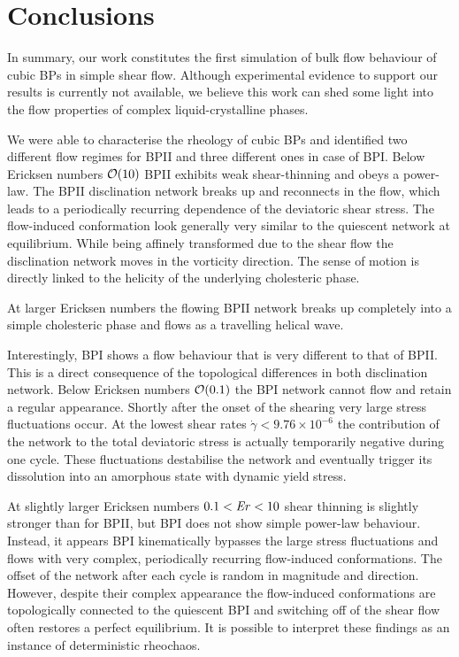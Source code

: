 \documentclass[aps,pre,reprint,superscriptaddress, twocolumn]{revtex4}
\newcommand{\e}[1]{\times10^{#1}}
\newcommand{\gd}{\dot{\gamma}}
\begin{document}
\clearpage

\section{Conclusions}

In summary, our work constitutes the first simulation of bulk flow behaviour 
of cubic BPs in simple shear flow. Although experimental evidence to support
our results is currently not available, we believe this work can shed some light into the 
flow properties of complex liquid-crystalline phases.
  
We were able to characterise the rheology of cubic BPs and identified 
two different flow regimes for BPII and three different ones in case of BPI. 
Below Ericksen numbers ${\cal O}(10)$ BPII exhibits weak shear-thinning and 
obeys a power-law.  The BPII disclination network breaks up and reconnects 
in the flow, which leads to a periodically recurring dependence 
of the deviatoric shear stress. The flow-induced conformation look generally
very similar to the quiescent network at equilibrium. 
While being affinely transformed due to the shear flow
the disclination network moves in the vorticity direction. The sense of
motion is directly linked to the helicity of the underlying cholesteric phase.

At larger Ericksen numbers the flowing BPII network breaks up completely into 
a simple cholesteric phase and flows as a travelling helical wave. 

Interestingly, BPI shows a flow behaviour that is very different to that of BPII.
This is a direct consequence of the topological differences in both disclination 
network. Below Ericksen numbers ${\cal O}(0.1)$ the BPI network cannot flow and 
retain a regular appearance. Shortly after the onset of the shearing 
very large stress fluctuations occur. At the lowest shear rates $\gd<9.76\e{-6}$
the contribution of the network to the total deviatoric stress is actually temporarily 
negative during one cycle. These fluctuations destabilise the network and 
eventually trigger its dissolution into an amorphous state with 
dynamic yield stress.

At slightly larger Ericksen numbers $0.1<{\it Er}<10$ shear thinning is 
slightly stronger than for BPII, but BPI does not show simple power-law 
behaviour. 
Instead, it appears BPI kinematically bypasses the large stress fluctuations and 
flows with very complex, periodically recurring flow-induced conformations.
The offset of the network after each cycle is random in magnitude and direction.
However, despite their complex appearance the flow-induced conformations are 
topologically connected to the quiescent BPI and switching off of the 
shear flow often restores a perfect equilibrium.
It is possible to interpret these findings as an instance of 
deterministic rheochaos.
\end{document}
